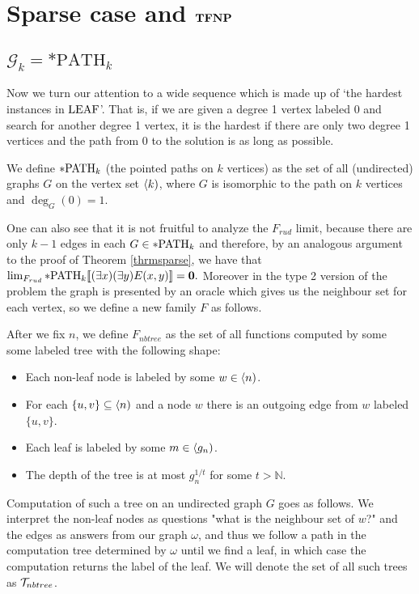 \chapter{Sparse case and \texorpdfstring{$\textbf{TFNP}$}{TFNP}}\label{chapsparse}

\section{\texorpdfstring{$\mathcal{G}_k=*\text{PATH}_k$}{Gk=*PATHk}}

Now we turn our attention to a wide sequence which is made up of `the hardest instances in $\text{LEAF}$'. That is, if we are given a degree 1 vertex labeled $0$ and search for another degree 1 vertex, it is the hardest if there are only two degree 1 vertices and the path from $0$ to the solution is as long as possible.

\begin{defi}
We define $*\text{PATH}_k$ (the pointed paths on $k$ vertices) as the set of all (undirected) graphs $G$ on the vertex set $\langle k)$, where $G$ is isomorphic to the path on $k$ vertices and $\deg_G(0)=1$.
\end{defi}

One can also see that it is not fruitful to analyze the $F_{rud}$ limit, because there are only $k-1$ edges in each $G\in*\text{PATH}_k$ and therefore, by an analogous argument to the proof of Theorem \ref{thrmsparse}, we have that $\lim_{F_{rud}}*\text{PATH}_k[\![(\exists x)(\exists y)E(x,y)]\!]=\textbf{0}.$ Moreover in the type 2 version of the problem the graph is presented by an oracle which gives us the neighbour set for each vertex, so we define a new family $F$ as follows.

\begin{defi}
After we fix $n$, we define $F_{nbtree}$ as the set of all functions computed by some some labeled tree with the following shape:

\begin{itemize}
\item Each non-leaf node is labeled by some $w\in\langle n)$. 
\item For each $\{u,v\} \subseteq \langle n)$ and a node $w$ there is an outgoing edge from $w$ labeled $\{u,v\}$.
\item Each leaf is labeled by some $m\in \langle g_n)$.
\item The depth of the tree is at most $g_n^{1/t}$ for some $t>\mathbb{N}$.
\end{itemize}

Computation of such a tree on an undirected graph $G$ goes as follows. We interpret the non-leaf nodes as questions "what is the neighbour set of $w$?" and the edges as answers from our graph $\omega$, and thus we follow a path in the computation tree determined by $\omega$ until we find a leaf, in which case the computation returns the label of the leaf. We will denote the set of all such trees as $\mathcal{T}_{nbtree}$.
\end{defi}

